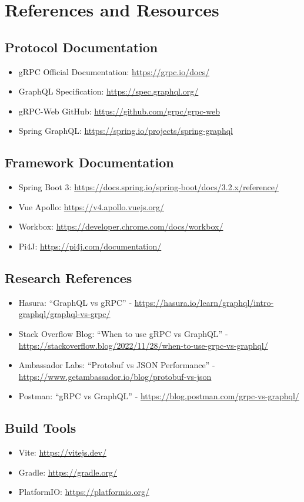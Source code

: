 \section{References and Resources}

\subsection{Protocol Documentation}
\begin{itemize}
    \item gRPC Official Documentation: \url{https://grpc.io/docs/}
    \item GraphQL Specification: \url{https://spec.graphql.org/}
    \item gRPC-Web GitHub: \url{https://github.com/grpc/grpc-web}
    \item Spring GraphQL: \url{https://spring.io/projects/spring-graphql}
\end{itemize}

\subsection{Framework Documentation}
\begin{itemize}
    \item Spring Boot 3: \url{https://docs.spring.io/spring-boot/docs/3.2.x/reference/}
    \item Vue Apollo: \url{https://v4.apollo.vuejs.org/}
    \item Workbox: \url{https://developer.chrome.com/docs/workbox/}
    \item Pi4J: \url{https://pi4j.com/documentation/}
\end{itemize}

\subsection{Research References}
\begin{itemize}
    \item Hasura: ``GraphQL vs gRPC'' - \url{https://hasura.io/learn/graphql/intro-graphql/graphql-vs-grpc/}
    \item Stack Overflow Blog: ``When to use gRPC vs GraphQL'' - \url{https://stackoverflow.blog/2022/11/28/when-to-use-grpc-vs-graphql/}
    \item Ambassador Labs: ``Protobuf vs JSON Performance'' - \url{https://www.getambassador.io/blog/protobuf-vs-json}
    \item Postman: ``gRPC vs GraphQL'' - \url{https://blog.postman.com/grpc-vs-graphql/}
\end{itemize}

\subsection{Build Tools}
\begin{itemize}
    \item Vite: \url{https://vitejs.dev/}
    \item Gradle: \url{https://gradle.org/}
    \item PlatformIO: \url{https://platformio.org/}
\end{itemize}
